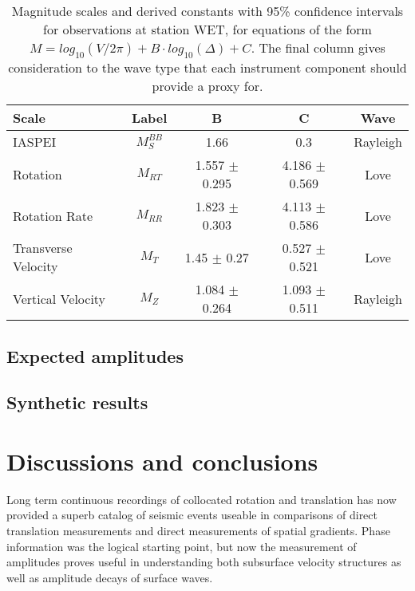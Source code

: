 \documentclass{gji}
\begin{document}
\begin{table*}
\begin{minipage}{115mm}
	\begin{center}
		\begin{tabular}{ |l|c|c|c|c| } 
		        \bf{Scale} & \bf{Label} & \bf{B} & \bf{C}  & \bf{Wave}\\ \hline
	IASPEI & $M_{S}^{BB}$ & 1.66 & 0.3  & Rayleigh \\ \hline
        Rotation  & $M_{RT}$ & 1.557 $\pm$ 0.295 & 4.186 $\pm$ 0.569  & Love \\ \hline
	Rotation Rate & $M_{RR}$ & 1.823 $\pm$ 0.303 & 4.113 $\pm$ 0.586  & Love\\ \hline 
        Transverse Velocity & $M_T$ & 1.45 $\pm$ 0.27 & 0.527 $\pm$ 0.521 & Love \\ \hline
        Vertical Velocity  & $M_Z$ & 1.084 $\pm$ 0.264 & 1.093 $\pm$ 0.511  & Rayleigh \\ \hline
		\end{tabular}
		
    		\caption{Magnitude scales and derived constants with 95\% confidence intervals for observations at station WET, for equations of the form $M = log_{10}(V/2\pi) + B\cdot log_{10}(\Delta) + C$. The final column gives consideration to the wave type that each instrument component should provide a proxy for.}
		\label{tab:scales}
	\end{center}
	\end{minipage}
\end{table*}

\subsection{Expected amplitudes}


\subsection{Synthetic results}

\section{Discussions and conclusions}
Long term continuous recordings of collocated rotation and translation has now provided a superb catalog of seismic events useable in comparisons of direct translation measurements and direct measurements of spatial gradients. Phase information was the logical starting point, but now the measurement of amplitudes proves useful in understanding both subsurface velocity structures as well as amplitude decays of surface waves. 
\end{document}
